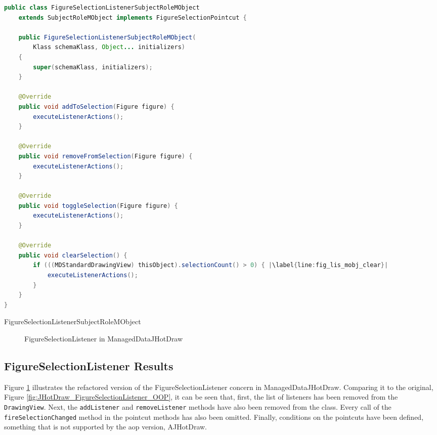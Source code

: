 \begin{sourcecode} [H]
	\begin{lstlisting}[language=Java, escapechar=|]
public class FigureSelectionListenerSubjectRoleMObject 
	extends SubjectRoleMObject implements FigureSelectionPointcut {

	public FigureSelectionListenerSubjectRoleMObject(
		Klass schemaKlass, Object... initializers) 
	{
		super(schemaKlass, initializers);
	}

	@Override
	public void addToSelection(Figure figure) {
		executeListenerActions();
	}

	@Override
	public void removeFromSelection(Figure figure) {
		executeListenerActions();
	}

	@Override
	public void toggleSelection(Figure figure) {
		executeListenerActions();
	}

	@Override
	public void clearSelection() {
		if (((MDStandardDrawingView) thisObject).selectionCount() > 0) { |\label{line:fig_lis_mobj_clear}|
			executeListenerActions();
		}
	}
}
	\end{lstlisting}
	\caption{FigureSelectionListenerSubjectRoleMObject}
	\label{lst:FigureSelectionListenerSubjectRoleMObject}
\end{sourcecode}

\begin{figure} [H]
	\centering
  	\caption{FigureSelectionListener in ManagedDataJHotDraw}
  	\label{fig:JHotDraw_FigureSelectionListener_MD}
\end{figure}

\subsection{FigureSelectionListener Results}
Figure \ref{fig:JHotDraw_FigureSelectionListener_MD} illustrates the refactored version of the FigureSelectionListener concern in ManagedDataJHotDraw.
Comparing it to the original, Figure \ref{fig:JHotDraw_FigureSelectionListener_OOP}, it can be seen that, first, the list of listeners has been removed from the \texttt{DrawingView}. 
Next, the \texttt{addListener} and \texttt{removeListener} methods have also been removed from the class.
Every call of the \texttt{fireSelectionChanged} method in the pointcut methods has also been omitted.
Finally, conditions on the pointcuts have been defined, something that is not supported by the \ac{aop} version, AJHotDraw.

